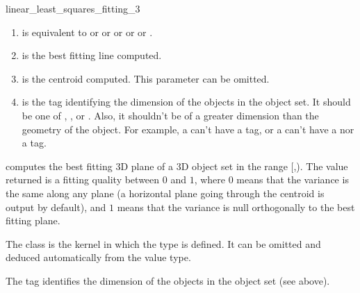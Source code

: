 \begin{ccRefFunction}{linear_least_squares_fitting_3}

\begin{enumerate}
   \item  {} is equivalent to  or
           or  or  or
           or .
   \item  {} is the best fitting line computed.
   \item  {} is the centroid computed. This parameter can be
          omitted.
   \item  {} is the tag identifying the dimension of the objects in the object set. It should be one of , ,  or . Also, it shouldn't be of a greater dimension than the geometry of the object. For example, a  can't have a  tag, or a  can't have a  nor a  tag.
\end{enumerate}


{ computes the best fitting 3D plane of a 3D object set in the range
[,). The value returned is a fitting quality
between $0$ and $1$, where $0$ means that the variance is the same
along any plane (a horizontal plane going through the centroid is output
by default), and $1$ means that the variance is null orthogonally
to the best fitting plane. }

The class  is the kernel in which the type
 is defined. It can be omitted and
deduced automatically from the value type.

The tag  identifies the dimension of the objects in the object set (see above). 



\end{ccRefFunction}
